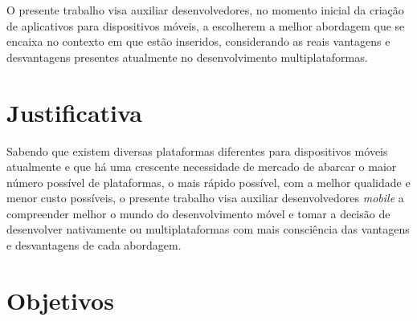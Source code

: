 O presente trabalho visa auxiliar desenvolvedores, no momento inicial da criação de aplicativos 
para dispositivos móveis, a escolherem a melhor abordagem que se encaixa no contexto em que estão inseridos,
considerando as reais vantagens e desvantagens presentes atualmente no desenvolvimento multiplataformas.

\section{Justificativa}\label{sec:justificativa}

Sabendo que existem diversas plataformas diferentes para dispositivos móveis atualmente e que há uma crescente 
necessidade de mercado de abarcar o maior número possível de plataformas, o mais rápido possível, com a
melhor qualidade e menor custo possíveis, o presente trabalho visa auxiliar desenvolvedores \textit{mobile} 
a compreender melhor o mundo do desenvolvimento móvel e tomar a decisão de 
desenvolver nativamente ou multiplataformas com mais consciência das vantagens e desvantagens de cada abordagem.

\section{Objetivos} \label{sec:objetivos}

